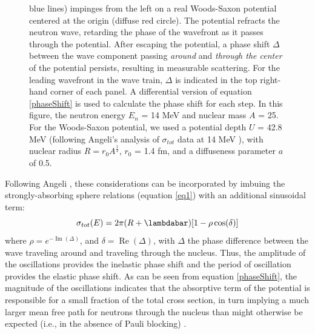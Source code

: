 \documentclass[twocolumn,secnumarabic,amssymb, nobibnotes, aps, prl,
superscriptaddress, nobalancelastpage]{revtex4}
\newcommand{\tots}{\ensuremath{\sigma_{tot}}\,\,}
\newcommand{\totE}{\ensuremath{\sigma_{tot}}(E)}
\begin{document}
\begin{figure}
\begin{minipage}{0.5\textwidth}
{            blue lines) impinges from the left on a real Woods-Saxon
            potential centered at the origin (diffuse red circle). The potential
            refracts the neutron wave,
            retarding the phase of the wavefront as it passes through the
            potential. After escaping the potential, a phase shift $\Delta$ between
            the wave component passing \textit{around} and \textit{through the center}
            of the potential persists, resulting in measurable scattering.
            For the leading wavefront in the wave train, $\Delta$ is indicated in
            the top right-hand corner of each panel. A differential version of equation 
            \ref{phaseShift} is used to
            calculate the phase shift for each step. In this figure, the neutron
            energy $E_{n}$ = 14 MeV and nuclear mass $A$ = 25. For the Woods-Saxon potential,
            we used a potential depth $U$ = 42.8 MeV (following Angeli's analysis
            of \tots data at 14 MeV \cite{Angeli1970}), with nuclear radius $R = 
            r_{0}A^{\frac{1}{3}}$, $r_{0}$ = 1.4 fm, and a diffuseness parameter
        $a$ of 0.5.}
        \label{RamsauerPhaseShiftFigure}
    \end{minipage}
\end{figure}


Following Angeli \cite{Angeli1970}, these considerations can be incorporated by
imbuing the strongly-absorbing sphere relations (equation \ref{eq1}) with an additional sinusoidal term:
\begin{equation}
    \totE = 2\pi (R+\lambdabar)[1 - \rho \cos(\delta)]
\end{equation}
where $\rho = e^{-\operatorname{Im}(\Delta)}$, and $\delta =
\operatorname{Re}(\Delta)$, with $\Delta$ the phase difference between the wave traveling
around and traveling through the nucleus. Thus, the amplitude of the oscillations provides the 
inelastic phase shift and the period of oscillation provides the elastic phase shift.
As can be seen from equation 
\ref{phaseShift}, the magnitude of the oscillations indicates that the
absorptive term of the potential is responsible for a small fraction of the total
cross section, in turn implying a much larger mean free path for neutrons through the nucleus 
than might otherwise be expected (i.e., in the absence of Pauli blocking)
\cite{Mohr1955}.
\end{document}
